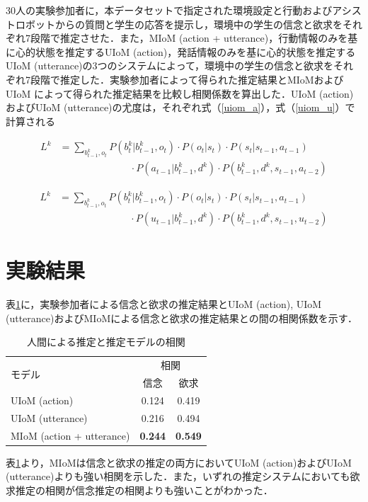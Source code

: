 \par
30人の実験参加者に，本データセットで指定された環境設定と行動およびアシストロボットからの質問と学生の応答を提示し，環境中の学生の信念と欲求をそれぞれ7段階で推定させた．また，MIoM (action + utterance)，行動情報のみを基に心的状態を推定するUIoM (action)，発話情報のみを基に心的状態を推定するUIoM (utterance)の3つのシステムによって，環境中の学生の信念と欲求をそれぞれ7段階で推定した．実験参加者によって得られた推定結果とMIoMおよびUIoM によって得られた推定結果を比較し相関係数を算出した．UIoM (action)およびUIoM (utterance)の尤度は，それぞれ式（\ref{uiom_a}），式（\ref{uiom_u}）で計算される

\begin{equation}
  \begin{split}
  \label{uiom_a}
  L^k&= \sum_{b_{t-1}^k,o_t}P(b_t^k|b_{t-1}^k,o_t)\cdot P(o_t|s_t)\cdot P(s_t|s_{t-1},a_{t-1})\\
  &\hspace{3cm}\cdot P(a_{t-1}|b_{t-1}^k,d^k)\cdot P(b_{t-1}^k,d^k,s_{t-1},a_{t-2})
  \end{split}
\end{equation}

\begin{equation}
  \begin{split}
  \label{uiom_u}
  L^k&= \sum_{b_{t-1}^k,o_t}P(b_t^k|b_{t-1}^k,o_t)\cdot P(o_t|s_t)\cdot P(s_t|s_{t-1},a_{t-1})\\
  &\hspace{3cm}\cdot P(u_{t-1}|b_{t-1}^k,d^k)\cdot P(b_{t-1}^k,d^k,s_{t-1},u_{t-2})
  \end{split}
\end{equation}


\section{実験結果}

\par
表\ref{tab:cof}に，実験参加者による信念と欲求の推定結果とUIoM (action), UIoM (utterance)およびMIoMによる信念と欲求の推定結果との間の相関係数を示す．

\begin{table}[htb]
  \begin{center}
  \caption{人間による推定と推定モデルの相関}
  \label{tab:cof}
  \begin{tabular}{lcc} \hline
    \multirow{2}{*}{モデル}&\multicolumn{2}{c}{相関}\\\cline{2-3}
    & \hspace{10pt} 信念 \hspace{10pt} & \hspace{10pt} 欲求 \hspace{10pt} \\ \hline
    UIoM (action)&0.124&0.419\\
    UIoM (utterance)&0.216&0.494\\
    MIoM (action + utterance)&\bf0.244&\bf0.549 \\\hline
  \end{tabular}
\end{center}
\end{table}


\par
表\ref{tab:cof}より，MIoMは信念と欲求の推定の両方においてUIoM (action)およびUIoM (utterance)よりも強い相関を示した．また，いずれの推定システムにおいても欲求推定の相関が信念推定の相関よりも強いことがわかった．
